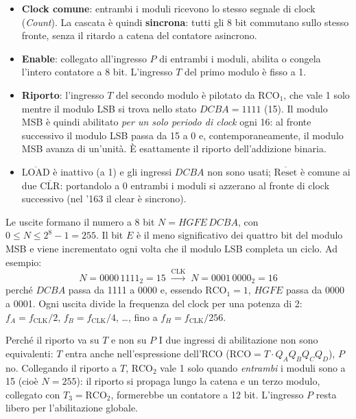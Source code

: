 \begin{itemize}[leftmargin=1.5em, itemsep=2pt]
    \item \textbf{Clock comune}: entrambi i moduli ricevono lo stesso segnale di clock
          (\emph{Count}). La cascata è quindi \textbf{sincrona}: tutti gli 8 bit commutano
          sullo stesso fronte, senza il ritardo a catena del contatore asincrono.
    \item \textbf{Enable}: collegato all'ingresso $P$ di entrambi i moduli, abilita o
          congela l'intero contatore a 8 bit. L'ingresso $T$ del primo modulo è fisso a 1.
    \item \textbf{Riporto}: l'ingresso $T$ del secondo modulo è pilotato da
          $\text{RCO}_1$, che vale 1 solo mentre il modulo LSB si trova nello stato
          $DCBA=1111$ (15). Il modulo MSB è quindi abilitato \emph{per un solo periodo di
          clock} ogni 16: al fronte successivo il modulo LSB passa da 15 a 0 e,
          contemporaneamente, il modulo MSB avanza di un'unità. È esattamente il riporto
          dell'addizione binaria.
    \item \textbf{$\overline{\text{LOAD}}$} è inattivo (a 1) e gli ingressi $DCBA$ non
          sono usati; \textbf{$\overline{\text{Reset}}$} è comune ai due $\overline{\text{CLR}}$:
          portandolo a 0 entrambi i moduli si azzerano al fronte di clock successivo
          (nel '163 il clear è sincrono).
\end{itemize}

\noindent Le uscite formano il numero a 8 bit $N = HGFE\,DCBA$, con $0 \le N \le 2^8-1=255$.
Il bit $E$ è il meno significativo dei quattro bit del modulo MSB e viene incrementato
ogni volta che il modulo LSB completa un ciclo. Ad esempio:
\[
N = 0000\,1111_2 = 15 \;\xrightarrow{\text{CLK}}\; N = 0001\,0000_2 = 16
\]
perché $DCBA$ passa da 1111 a 0000 e, essendo $\text{RCO}_1=1$, $HGFE$ passa da 0000 a 0001.
Ogni uscita divide la frequenza del clock per una potenza di 2: $f_A = f_{\text{CLK}}/2$,
$f_B = f_{\text{CLK}}/4$, \dots, fino a $f_H = f_{\text{CLK}}/256$.

\begin{osservazione}{Perché il riporto va su $T$ e non su $P$}
I due ingressi di abilitazione non sono equivalenti: $T$ entra anche nell'espressione
dell'RCO ($\text{RCO}=T\cdot Q_AQ_BQ_CQ_D$), $P$ no. Collegando il riporto a $T$,
$\text{RCO}_2$ vale 1 solo quando \emph{entrambi} i moduli sono a 15 (cioè $N=255$): il
riporto si propaga lungo la catena e un terzo modulo, collegato con $T_3=\text{RCO}_2$,
formerebbe un contatore a 12 bit. L'ingresso $P$ resta libero per l'abilitazione globale.
\end{osservazione}


